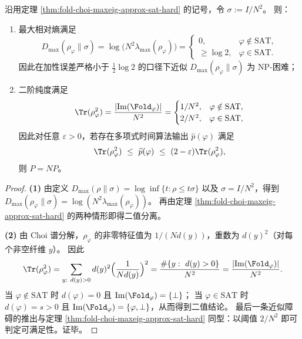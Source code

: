 \begin{corollary}[最大相对熵与二阶纯度的二值谱指纹]\label{cor:fold-choi-binary-fingerprints}
沿用定理 \ref{thm:fold-choi-maxeig-approx-sat-hard} 的记号，令 \(\sigma:=I/N^2\)。
则：
\begin{enumerate}
  \item 最大相对熵满足
  \[
  D_{\max}(\rho_\varphi\|\sigma)=\log\bigl(N^2\lambda_{\max}(\rho_\varphi)\bigr)
  =
  \begin{cases}
  0, & \varphi\notin\mathrm{SAT},\\
  \ge \log 2, & \varphi\in\mathrm{SAT}.
  \end{cases}
  \]
  因此在加性误差严格小于 \(\frac12\log 2\) 的口径下近似 \(D_{\max}(\rho_\varphi\|\sigma)\) 为 NP-困难；
  \item 二阶纯度满足
  \[
  \Tr(\rho_\varphi^2)=\frac{|\mathrm{Im}(\Fold_\varphi)|}{N^2}
  =
  \begin{cases}
  1/N^2, & \varphi\notin\mathrm{SAT},\\
  2/N^2, & \varphi\in\mathrm{SAT},
  \end{cases}
  \]
  因此对任意 \(\varepsilon>0\)，若存在多项式时间算法输出 \(\widehat p(\varphi)\) 满足
  \[
  \Tr(\rho_\varphi^2)\ \le\ \widehat p(\varphi)\ \le\ (2-\varepsilon)\Tr(\rho_\varphi^2),
  \]
  则 \(P=NP\)。
\end{enumerate}
\end{corollary}
\begin{proof}
\textbf{(1)} 由定义 \(D_{\max}(\rho\|\sigma)=\log\inf\{t:\rho\le t\sigma\}\) 以及 \(\sigma=I/N^2\)，得到
\(
D_{\max}(\rho_\varphi\|\sigma)=\log(N^2\lambda_{\max}(\rho_\varphi))
\)。
再由定理 \ref{thm:fold-choi-maxeig-approx-sat-hard} 的两种情形即得二值分离。

\textbf{(2)} 由 Choi 谱分解，\(\rho_\varphi\) 的非零特征值为 \(1/(N d(y))\)，重数为 \(d(y)^2\)（对每个非空纤维 \(y\)）。
因此
\[
\Tr(\rho_\varphi^2)=\sum_{y:\ d(y)>0} d(y)^2\Bigl(\frac{1}{N d(y)}\Bigr)^2=\frac{\#\{y:\ d(y)>0\}}{N^2}=\frac{|\mathrm{Im}(\Fold_\varphi)|}{N^2}.
\]
当 \(\varphi\notin\mathrm{SAT}\) 时 \(d(\varphi)=0\) 且 \(\mathrm{Im}(\Fold_\varphi)=\{\bot\}\)；
当 \(\varphi\in\mathrm{SAT}\) 时 \(d(\varphi)=s>0\) 且 \(\mathrm{Im}(\Fold_\varphi)=\{\varphi,\bot\}\)，从而得到二值结论。
最后一条近似障碍的推出与定理 \ref{thm:fold-choi-maxeig-approx-sat-hard} 同型：以阈值 \(2/N^2\) 即可判定可满足性。证毕。
\end{proof}

